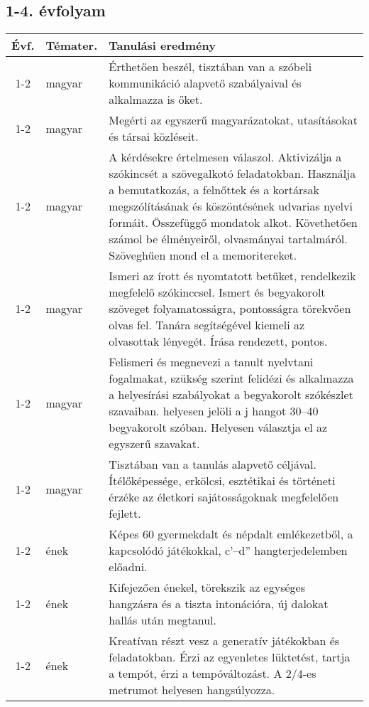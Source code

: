 \subsection{1-4. évfolyam}
\begin{small}
  \begin{longtable}{c | p{2cm} |  p{11cm} }
    \textbf{Évf.} & \textbf{Témater.} & \textbf{Tanulási eredmény} \\ \hline \hline
    \endhead

              1-2 & magyar & Érthetően beszél, tisztában van a szóbeli kommunikáció alapvető szabályaival és alkalmazza is őket. \\ \hline
              1-2 & magyar & Megérti az egyszerű magyarázatokat, utasításokat és társai közléseit. \\ \hline
              1-2 & magyar & A kérdésekre értelmesen válaszol. Aktivizálja a szókincsét a szövegalkotó feladatokban. Használja a bemutatkozás, a felnőttek és a kortársak megszólításának és köszöntésének udvarias nyelvi formáit. Összefüggő mondatok alkot. Követhetően számol be élményeiről, olvasmányai tartalmáról. Szöveghűen mond el a memoritereket. \\ \hline
              1-2 & magyar & Ismeri az írott és nyomtatott betűket, rendelkezik megfelelő szókinccsel. Ismert és begyakorolt szöveget folyamatosságra, pontosságra törekvően olvas fel. Tanára segítségével kiemeli az olvasottak lényegét. Írása rendezett, pontos. \\ \hline
              1-2 & magyar & Felismeri és megnevezi a tanult nyelvtani fogalmakat, szükség szerint felidézi és alkalmazza a helyesírási szabályokat a begyakorolt szókészlet szavaiban. helyesen jelöli a j hangot 30–40 begyakorolt szóban. Helyesen választja el az egyszerű szavakat. \\ \hline
              1-2 & magyar & Tisztában van a tanulás alapvető céljával. Ítélőképessége, erkölcsi, esztétikai és történeti érzéke az életkori sajátosságoknak megfelelően fejlett. \\ \hline
              1-2 & ének & Képes 60 gyermekdalt és népdalt emlékezetből, a kapcsolódó játékokkal, c’–d” hangterjedelemben előadni. \\ \hline
              1-2 & ének & Kifejezően énekel, törekszik az egységes hangzásra és a tiszta intonációra, új dalokat hallás után megtanul. \\ \hline
              1-2 & ének & Kreatívan részt vesz a generatív játékokban és feladatokban. Érzi az egyenletes lüktetést, tartja a tempót, érzi a tempóváltozást. A 2/4-es metrumot helyesen hangsúlyozza. \\ \hline

\end{longtable}
\end{small}
